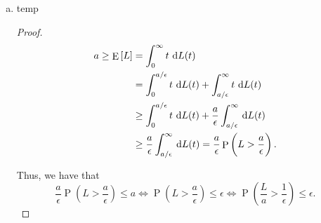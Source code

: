 \documentclass[letterpaper]{article}
\DeclareMathOperator{\E}{E}
\DeclareMathOperator{\Prob}{P}
\begin{document}
\begin{enumerate}[(a)]
\begin{proof}
    There is an additional $\sigma^2$ term to account for the variance of our
    new observation.
  \end{proof}
\item temp
  \begin{proof}
    \begin{align*}
      a \geq \E\left[L\right]
      &= \int_0^\infty t \,\dif L(t) \\
      &= \int_0^{a/\epsilon} t \,\dif L(t) + \int_{a/\epsilon}^\infty t \,\dif L(t) \\
      &\geq \int_0^{a/\epsilon} t \,\dif L(t) + \frac{a}{\epsilon}\int_{a/\epsilon}^\infty \,\dif L(t) \\
      &\geq \frac{a}{\epsilon}\int_{a/\epsilon}^\infty \,\dif L(t) = \frac{a}{\epsilon}\Prob\left(L > \frac{a}{\epsilon}\right).
    \end{align*}

    Thus, we have that
    \begin{equation*}
      \frac{a}{\epsilon}\Prob\left(L > \frac{a}{\epsilon}\right) \leq a
      \Leftrightarrow
      \Prob\left(L > \frac{a}{\epsilon}\right) \leq \epsilon
      \Leftrightarrow
      \Prob\left(\frac{L}{a} > \frac{1}{\epsilon}\right) \leq \epsilon.
    \end{equation*}
  \end{proof}
\end{enumerate}
\end{document}
